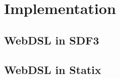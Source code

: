 
\chapter{\label{chap:implementation}Implementation}

\section{WebDSL in SDF3}

\section{WebDSL in Statix}
